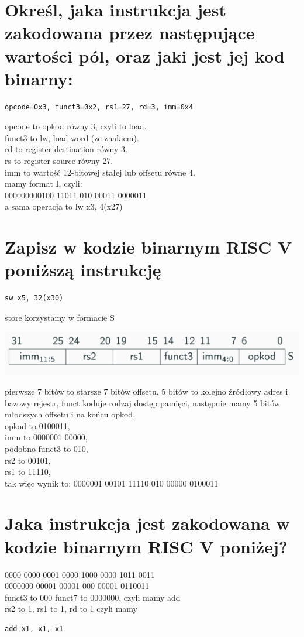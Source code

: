 \documentclass{article}
\begin{document}
\section{Określ, jaka instrukcja jest zakodowana przez następujące wartości pól, oraz jaki jest jej kod binarny:}
\begin{lstlisting}
opcode=0x3, funct3=0x2, rs1=27, rd=3, imm=0x4
\end{lstlisting}
opcode to opkod równy 3, czyli to load.\\
funct3 to lw, load word (ze znakiem).\\
rd to register destination równy 3.\\
rs to register source równy 27.\\
imm to wartość 12-bitowej stałej lub offsetu równe 4.\\
mamy format I, czyli:\\
000000000100 11011 010 00011 0000011\\
a sama operacja to lw x3, 4(x27) 
\section{Zapisz w kodzie binarnym RISC V poniższą instrukcję}
\begin{lstlisting}
sw x5, 32(x30)
\end{lstlisting}
store korzystamy w formacie S
\begin{center}
\includegraphics[scale=0.3]{./L12Z06.png}
\end{center}
pierwsze 7 bitów to starsze 7 bitów offsetu, 5 bitów to kolejno źródłowy adres i bazowy rejestr, funct koduje rodzaj dostęp pamięci, następnie mamy 5 bitów młodszych offsetu i na końcu opkod.\\
opkod to 0100011,\\ 
imm to 0000001 00000,\\
podobno funct3 to 010,\\ 
rs2 to 00101, \\
rs1 to 11110,\\
tak więc wynik to: 0000001 00101 11110 010 00000 0100011
\section{Jaka instrukcja jest zakodowana w kodzie binarnym RISC V poniżej?}
0000 0000 0001 0000 1000 0000 1011 0011\\
0000000 00001 00001 000 00001 0110011\\
funct3 to 000 funct7 to 0000000, czyli mamy add\\
rs2 to 1, rs1 to 1, rd to 1
czyli mamy 
\begin{lstlisting}
add x1, x1, x1
\end{lstlisting}
\end{document}
